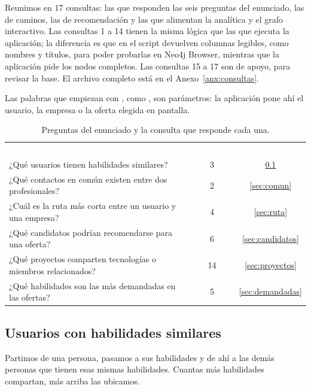 \documentclass[11pt, a4paper]{article}
\newcommand{\cabecera}{\rowcolor{azul}}
\newcommand{\h}[1]{\textcolor{white}{\textbf{#1}}}
\newcommand{\cod}[1]{\texttt{\detokenize{#1}}}
\begin{document}
Reunimos en \cod{queries.cypher} 17 consultas: las que responden las seis preguntas del
enunciado, las de caminos, las de recomendación y las que alimentan la analítica y el
grafo interactivo. Las consultas 1 a 14 tienen la misma lógica que las que ejecuta la
aplicación; la diferencia es que en el script devuelven columnas legibles, como nombres
y títulos, para poder probarlas en Neo4j Browser, mientras que la aplicación pide los
nodos completos. Las consultas 15 a 17 son de apoyo, para revisar la base. El archivo completo está en el Anexo~\ref{anx:consultas}.

Las palabras que empiezan con \cod{$}, como \cod{$uid}, son parámetros: la aplicación
pone ahí el usuario, la empresa o la oferta elegida en pantalla.

\begin{table}[htbp]
\centering
\caption{Preguntas del enunciado y la consulta que responde cada una.}
\small
\begin{tabularx}{\linewidth}{@{}L c c@{}}
\cabecera \h{Pregunta} & \h{Consulta} & \h{Sección} \\
¿Qué usuarios tienen habilidades similares?                        & 3  & \ref{sec:similares} \\
¿Qué contactos en común existen entre dos profesionales?           & 2  & \ref{sec:comun} \\
¿Cuál es la ruta más corta entre un usuario y una empresa?         & 4  & \ref{sec:ruta} \\
¿Qué candidatos podrían recomendarse para una oferta?              & 6  & \ref{sec:candidatos} \\
¿Qué proyectos comparten tecnologías o miembros relacionados?      & 14 & \ref{sec:proyectos} \\
¿Qué habilidades son las más demandadas en las ofertas?            & 5  & \ref{sec:demandadas} \\
\bottomrule
\end{tabularx}
\end{table}

\subsection{Usuarios con habilidades similares}\label{sec:similares}

Partimos de una persona, pasamos a sus habilidades y de ahí a las demás personas que
tienen esas mismas habilidades. Cuantas más habilidades compartan, más arriba las ubicamos.
\end{document}
